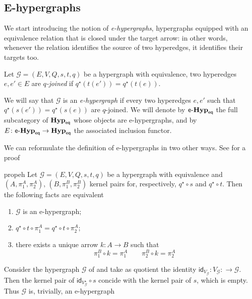 \documentclass[3p]{elsarticle}
\newcommand{\eq}{\mathsf{eq}}
\newcommand{\catname}[1]{\textbf{\textup{#1}}}
\newcommand{\EqHyp}{\catname{Hyp}_{\mathsf{eq}}} %
\newcommand{\egg}{\mathsf{e}\text{-}\catname{Hyp}_\eq}
\newcommand{\id}[1]{\mathsf{id}_{#1}}
\theoremstyle{remark}
\theoremstyle{definition}
\begin{document}
\subsection{E-hypergraphs}

We start introducing the notion of \emph{e-hypergraphs}, hypergraphs equipped with an equivalence relation that is closed under the target arrow:
in other words, whenever the relation identifies the source of two hyperedges, it identifies their targets too.

\begin{defi}
Let $\mathcal{G} = (E, V, Q, s, t, q)$ be a hypergraph with equivalence, two  hyperedges $e, e'\in E$ are \emph{$q$-joined} if $q^\star(t(e'))=q^\star(t(e))$.
 
We will say that $\mathcal{G}$ is an \emph{e-hypergraph} if every two  hyperedges $e,e'$ such that
$q^\star(s(e'))=q^\star(s(e))$ are $q$-joined.
We will denote by $\egg$ the full subcategory of $\EqHyp$ whose objects are e-hypergraphs, and by $E\colon \egg \to \EqHyp$ the associated inclusion functor. 
\end{defi}

We can reformulate the definition of e-hypergraphs in two other ways. See  for a proof

\begin{restatable}{prop}{eh}\label{prop:eh}
Let $\mathcal{G} = (E, V, Q, s, t, q)$ be a hypergraph with equivalence and $(A, \pi^A_1, \pi^A_2)$, $(B, \pi^B_1, \pi^B_2)$ kernel pairs for, respectively, $q^\star\circ s$ and $q^\star\circ t$. Then the following facts are equivalent
\begin{enumerate}
	\item $\mathcal{G}$ is an e-hypergraph;
	\item $q^\star\circ t\circ \pi^A_1=q^\star\circ t\circ \pi^A_2$;
	\item there exists a unique arrow $k\colon A\to B$ such that 
	\[\pi^B_1\circ k = \pi^A_1 \qquad \pi^B_2\circ k = \pi^A_2 \]
	\end{enumerate}\end{restatable}


\begin{exa}
	Consider the hypergraph $\mathcal{G}$ of  and take as quotient the identity $\id{V_\mathcal{G}}\colon V_\mathcal{G}\colon \to\mathcal{G}$. Then the kernel pair of $\id{V^\star_\mathcal{G}} \circ s$ concide with the kernel pair of $s$, which is empty. Thus  $\mathcal{G}$ is, trivially, an e-hypergraph
\end{exa}
\end{document}
